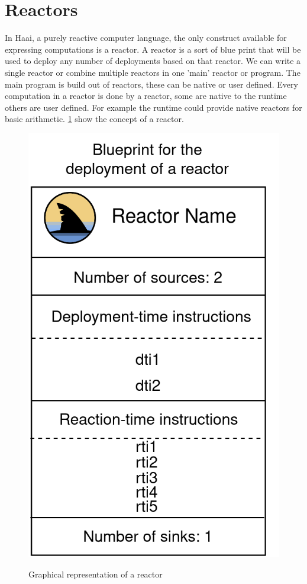 \documentclass[a4paper]{book}
\begin{document}
\section{Reactors}
In Haai, a purely reactive computer language, the only construct available for expressing computations is a reactor. A reactor is a sort of blue print that will be used to deploy any number of deployments based on that reactor. We can write a single reactor or combine multiple reactors in one 'main' reactor or program. The main program is build out of reactors, these can be native or user defined. Every computation in a reactor is done by a reactor, some are native to the runtime others are user defined. For example the runtime could provide native reactors for basic arithmetic. \ref{fig:reactor} show the concept of a reactor.

\begin{figure}[h]
	\caption{Graphical representation of a reactor}
	\includegraphics[scale=0.2]{reactor300.drawio}
	\centering
	\label{fig:reactor}
\end{figure}
\end{document}
